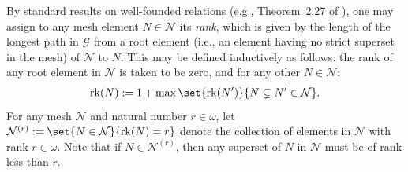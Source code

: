 By standard results on well-founded relations (e.g., Theorem~2.27 of \cite{Jec03}), one may assign to any mesh element $N \in \mathcal{N}$ its \textit{rank}, which is given by the length of the longest path in $\mathcal{G}$ from a root element (i.e., an element having no strict superset in the mesh) of $\mathcal{N}$ to $N$. This may be defined inductively as follows: the rank of any root element in $\mathcal{N}$ is taken to be zero, and for any other $N \in \mathcal{N}$:
\begin{align*}
    \operatorname{rk}(N) := 1 + \max \set{\operatorname{rk}(N')}{N \subsetneq N' \in \mathcal{N}}.
\end{align*}
For any mesh $\mathcal{N}$ and natural number $r \in \omega$, let $\mathcal{N}^{(r)} := \set{N \in \mathcal{N}}{\operatorname{rk}(N) = r}$ denote the collection of elements in $\mathcal{N}$ with rank $r \in \omega$. Note that if $N \in \mathcal{N}^{(r)}$, then any superset of $N$ in $\mathcal{N}$ must be of rank less than $r$.

